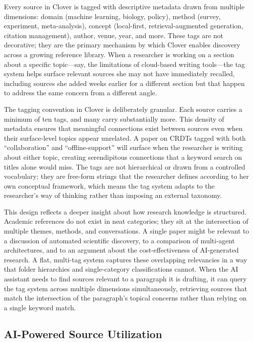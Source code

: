 \documentclass[a4paper,11pt]{article}
\begin{document}
Every source in Clover is tagged with descriptive metadata drawn from multiple dimensions: domain (machine learning, biology, policy), method (survey, experiment, meta-analysis), concept (local-first, retrieval-augmented generation, citation management), author, venue, year, and more. These tags are not decorative; they are the primary mechanism by which Clover enables discovery across a growing reference library. When a researcher is working on a section about a specific topic---say, the limitations of cloud-based writing tools---the tag system helps surface relevant sources she may not have immediately recalled, including sources she added weeks earlier for a different section but that happen to address the same concern from a different angle.

The tagging convention in Clover is deliberately granular. Each source carries a minimum of ten tags, and many carry substantially more. This density of metadata ensures that meaningful connections exist between sources even when their surface-level topics appear unrelated. A paper on CRDTs tagged with both ``collaboration'' and ``offline-support'' will surface when the researcher is writing about either topic, creating serendipitous connections that a keyword search on titles alone would miss. The tags are not hierarchical or drawn from a controlled vocabulary; they are free-form strings that the researcher defines according to her own conceptual framework, which means the tag system adapts to the researcher's way of thinking rather than imposing an external taxonomy.

This design reflects a deeper insight about how research knowledge is structured. Academic references do not exist in neat categories; they sit at the intersection of multiple themes, methods, and conversations. A single paper might be relevant to a discussion of automated scientific discovery, to a comparison of multi-agent architectures, and to an argument about the cost-effectiveness of AI-generated research. A flat, multi-tag system captures these overlapping relevancies in a way that folder hierarchies and single-category classifications cannot. When the AI assistant needs to find sources relevant to a paragraph it is drafting, it can query the tag system across multiple dimensions simultaneously, retrieving sources that match the intersection of the paragraph's topical concerns rather than relying on a single keyword match.

\subsection{AI-Powered Source Utilization}
\end{document}
